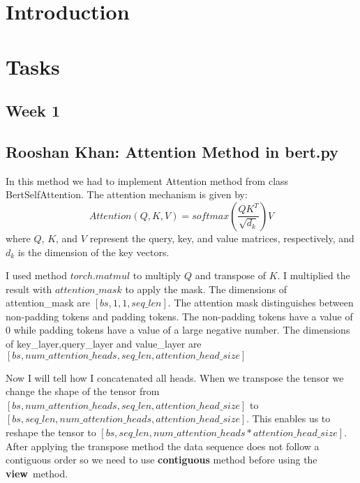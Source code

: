 \documentclass{article}
\begin{document}
\section{Introduction}

\section{Tasks}
\subsection{Week 1}
\subsection{Rooshan Khan: Attention Method in bert.py}
In this method we had to implement Attention method from class BertSelfAttention. The attention mechanism is given by:
\begin{equation} \label{eqn}
Attention(Q,K,V) = {softmax(\frac{QK^T}{\sqrt{d_k}})V}
\end{equation}
where \( Q \), \( K \), and \( V \) represent the query, key, and value matrices, respectively, and \( d_k \) is the dimension of the key vectors.

I used method \( torch.matmul \) to multiply \( Q \) and transpose of \( K \). I multiplied the result with \( attention\_mask \) to apply the mask. The dimensions of attention\_mask are \( [bs, 1, 1, seq\_len] \). The attention mask distinguishes between non-padding tokens and padding tokens. The non-padding tokens have a value of 0 while padding tokens have a value of a large negative number. The dimensions of key\_layer,query\_layer and value\_layer are \( [bs, num\_attention\_heads, seq\_len, attention\_head\_size] \)

Now I will tell how I concatenated all heads. When we transpose the tensor we change the shape of the tensor from \( [bs,num\_attention\_heads,seq\_len,attention\_head\_size] \) to \( [bs,seq\_len,num\_attention\_heads,attention\_head\_size] \). This enables us to reshape the tensor to \( [bs,seq\_len,num\_attention\_heads*attention\_head\_size] \). After applying the transpose method the data sequence does not follow a contiguous order so we need to use \textbf{contiguous} method before using the \textbf{view}\ method.
\end{document}
